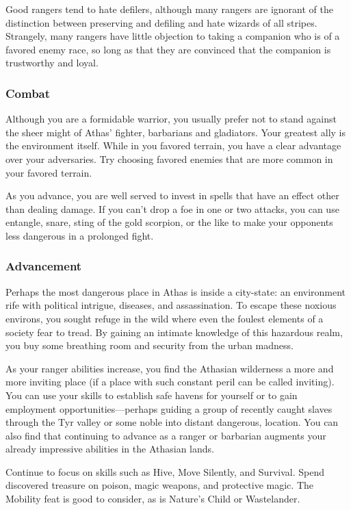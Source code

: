 Good rangers tend to hate defilers, although many rangers are ignorant of the distinction between preserving and defiling and hate wizards of all stripes. Strangely, many rangers have little objection to taking a companion who is of a favored enemy race, so long as that they are convinced that the companion is trustworthy and loyal.

\subsubsection{Combat}

Although you are a formidable warrior, you usually prefer not to stand against the sheer might of Athas' fighter, barbarians and gladiators. Your greatest ally is the environment itself. While in you favored terrain, you have a clear advantage over your adversaries. Try choosing favored enemies that are more common in your favored terrain.

As you advance, you are well served to invest in spells that have an effect other than dealing damage. If you can't drop a foe in one or two attacks, you can use entangle, snare, sting of the gold scorpion, or the like to make your opponents less dangerous in a prolonged fight.

\subsubsection{Advancement}

Perhaps the most dangerous place in Athas is inside a city-state: an environment rife with political intrigue, diseases, and assassination. To escape these noxious environs, you sought refuge in the wild where even the foulest elements of a society fear to tread. By gaining an intimate knowledge of this hazardous realm, you buy some breathing room and security from the urban madness.

As your ranger abilities increase, you find the Athasian wilderness a more and more inviting place (if a place with such constant peril can be called inviting). You can use your skills to establish safe havens for yourself or to gain employment opportunities---perhaps guiding a group of recently caught slaves through the Tyr valley or some noble into distant dangerous, location. You can also find that continuing to advance as a ranger or barbarian augments your already impressive abilities in the Athasian lands.

Continue to focus on skills such as Hive, Move Silently, and Survival. Spend discovered treasure on poison, magic weapons, and protective magic. The Mobility feat is good to consider, as is Nature's Child or Wastelander.

